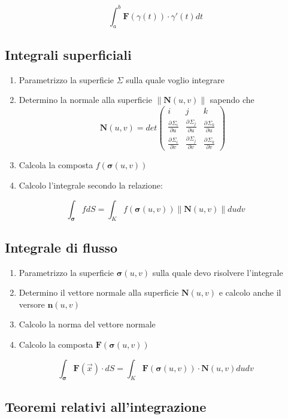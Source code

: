 \documentclass[10pt,a4paper]{report}
\newcommand{\pdv}[3]{\frac{\partial^{#2} #1}{\partial #3^{#2}}}
\newcommand{\norm}[1]{ \left\lVert {#1} \right\rVert}
\begin{document}
		\[ \int_{a}^{b} \mathbf{F}(\gamma (t)) \cdot \gamma '(t) dt \]
		
		\subsection*{Integrali \textbf{superficiali}}
			\begin{enumerate}
				\item Parametrizzo la superficie $ \Sigma $ sulla quale voglio integrare
				\item Determino la normale alla superficie $\norm{\mathbf{N}(u,v)} $ sapendo che \\
                \[ \mathbf{N}(u,v) = det \left(\begin{array}{ccc} i & j & k\\ \pdv{\Sigma_{i} }{}{u} & \pdv{\Sigma_{j}}{}{u} & \pdv{\Sigma_{k}}{}{u} \\ \pdv{\Sigma_{i}}{}{v} & \pdv{\Sigma_{j}}{}{v} & \pdv{\Sigma_{k}}{}{v} \end{array}\right) \]
				\item Calcola la composta $f(\mathbf{\sigma} (u,v))$
				\item Calcolo l'integrale secondo la relazione:
			\end{enumerate}
		\[ \int_{\mathbf{\sigma}} fdS = \int_{K} f(\mathbf{\sigma} (u,v)) \norm{\mathbf{N}(u,v)}dudv \]
		
		\subsection*{Integrale di \textbf{flusso}}
		
		\begin{enumerate}
			\item Parametrizzo la superficie $ \mathbf{\sigma}(u,v) $ sulla quale devo risolvere l'integrale 
			\item Determino il vettore normale alla superficie $ \mathbf{N}(u,v) $ e calcolo anche il versore $ \mathbf{n}(u,v) $
			\item Calcolo la norma del vettore normale 
			\item Calcolo la composta $ \mathbf{F}(\mathbf{\sigma}(u,v)) $
		\end{enumerate}
		
		\[  \int_{\mathbf{\sigma}} \mathbf{F}(\vec{x}) \cdot dS = \int_{K} \mathbf{F}(\mathbf{\sigma}(u,v)) \cdot \mathbf{N}(u,v) dudv\]
		
		\subsection*{Teoremi relativi all'integrazione}
		
\end{document}
